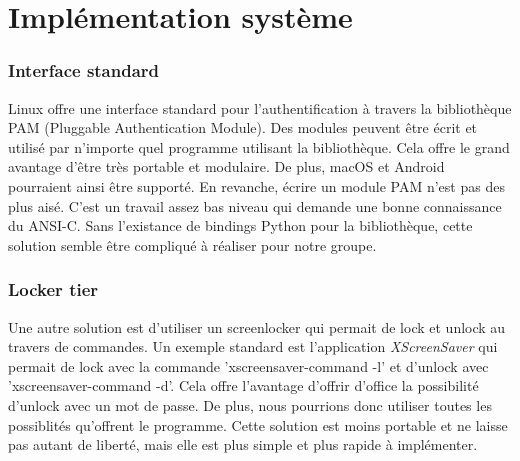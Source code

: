 \part{Implémentation système}
\section{Interface standard}

Linux offre une interface standard pour l'authentification à travers la
bibliothèque PAM (Pluggable Authentication Module). Des modules peuvent être
écrit et utilisé par n'importe quel programme utilisant la bibliothèque.
Cela offre le grand avantage d'être très portable et modulaire. De plus, macOS
et Android pourraient ainsi être supporté.
En revanche, écrire un module PAM n'est pas des plus aisé. C'est un travail
assez bas niveau qui demande une bonne connaissance du ANSI-C.
Sans l'existance de bindings Python pour la bibliothèque, cette solution semble
être compliqué à réaliser pour notre groupe.

\section{Locker tier}

Une autre solution est d'utiliser un screenlocker qui permait de lock et unlock
au travers de commandes. Un exemple standard est l'application \emph{XScreenSaver}
qui permait de lock avec la commande 'xscreensaver-command -l' et d'unlock avec
'xscreensaver-command -d'.
Cela offre l'avantage d'offrir d'office la possibilité d'unlock avec un mot de
passe. De plus, nous pourrions donc utiliser toutes les possiblités qu'offrent
le programme.
Cette solution est moins portable et ne laisse pas autant de liberté, mais elle
est plus simple et plus rapide à implémenter.
